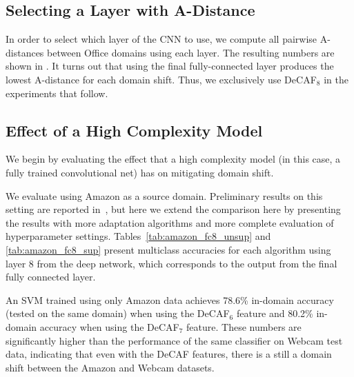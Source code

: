 \subsection{Selecting a Layer with A-Distance}

In order to select which layer of the CNN to use, we compute all pairwise
A-distances between Office domains using each layer. The resulting numbers are
shown in . It turns out that using the
final fully-connected layer produces the lowest A-distance for each domain
shift. Thus, we exclusively use DeCAF$_8$ in the experiments that follow.


\subsection{Effect of a High Complexity Model}




We begin by evaluating the effect that a high complexity model (in this case, a
fully trained convolutional net) has on mitigating domain shift.

We evaluate using Amazon as a source domain. 
Preliminary results on this setting are reported in~\cite{deeplearning-arxiv-2013}, but here 
we extend the comparison here by
presenting the results with more adaptation algorithms and more complete
evaluation of hyperparameter settings. Tables~\ref{tab:amazon_fc8_unsup} and \ref{tab:amazon_fc8_sup} present %
multiclass accuracies for each algorithm using layer 8 from the deep
network, which corresponds to the output from the final fully connected layer.

 An SVM trained using only Amazon data achieves 78.6\% in-domain accuracy (tested on the same domain) when using the DeCAF$_6$ feature and 80.2\% in-domain accuracy when using the DeCAF$_7$ feature. These numbers are significantly higher than the performance of the same classifier on Webcam test data, indicating that even with the DeCAF features, there is a still a domain shift between the Amazon and Webcam datasets. 

